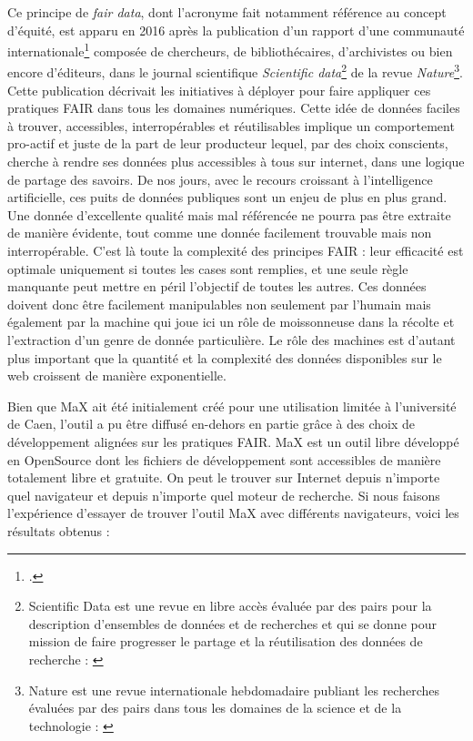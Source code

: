 \documentclass[a4paper,12pt,twoside]{book}
\begin{document}
Ce principe de \textit{fair data}, dont l'acronyme fait notamment référence au concept d'équité, est apparu en 2016 après la publication d'un rapport d'une communauté internationale\footcite{wilkinson_fair_2016} composée de chercheurs, de bibliothécaires, d'archivistes ou bien encore d'éditeurs, dans le journal scientifique \textit{Scientific data}\footnote{Scientific Data est une revue en libre accès évaluée par des pairs pour la description d'ensembles de données et de recherches et qui se donne pour mission de faire progresser le partage et la réutilisation des données de recherche : \cite{scientific-data}} de la revue \textit{Nature}\footnote{Nature est une revue internationale hebdomadaire publiant les recherches évaluées par des pairs dans tous les domaines de la science et de la technologie : \cite{nature}}. Cette publication décrivait les initiatives à déployer pour faire appliquer ces pratiques FAIR dans tous les domaines numériques.
Cette idée de données faciles à trouver, accessibles, interropérables et réutilisables implique un comportement pro-actif et juste de la part de leur producteur lequel, par des choix conscients, cherche à rendre ses données plus accessibles à tous sur internet, dans une logique de partage des savoirs. De nos jours, avec le recours croissant à l'intelligence artificielle, ces puits de données publiques sont un enjeu de plus en plus grand. Une donnée d'excellente qualité mais mal référencée ne pourra pas être extraite de manière évidente, tout comme une donnée facilement trouvable mais non interropérable. C'est là toute la complexité des principes FAIR : leur efficacité est optimale uniquement si toutes les cases sont remplies, et une seule règle manquante peut mettre en péril l'objectif de toutes les autres. Ces données doivent donc être facilement manipulables non seulement par l'humain mais également par la machine qui joue ici un rôle de moissonneuse dans la récolte et l'extraction d'un genre de donnée particulière. Le rôle des machines est d'autant plus important que la quantité et la complexité des données disponibles sur le web croissent de manière exponentielle.


Bien que MaX ait été initialement créé pour une utilisation limitée à l'université de Caen, l'outil a pu être diffusé en-dehors en partie grâce à des choix de développement alignées sur les pratiques FAIR.
MaX est un outil libre développé en OpenSource dont les fichiers de développement sont accessibles de manière totalement libre et gratuite. On peut le trouver sur Internet depuis n'importe quel navigateur et depuis n'importe quel moteur de recherche.
Si nous faisons l'expérience d'essayer de trouver l'outil MaX avec différents navigateurs, voici les résultats obtenus :
\end{document}
